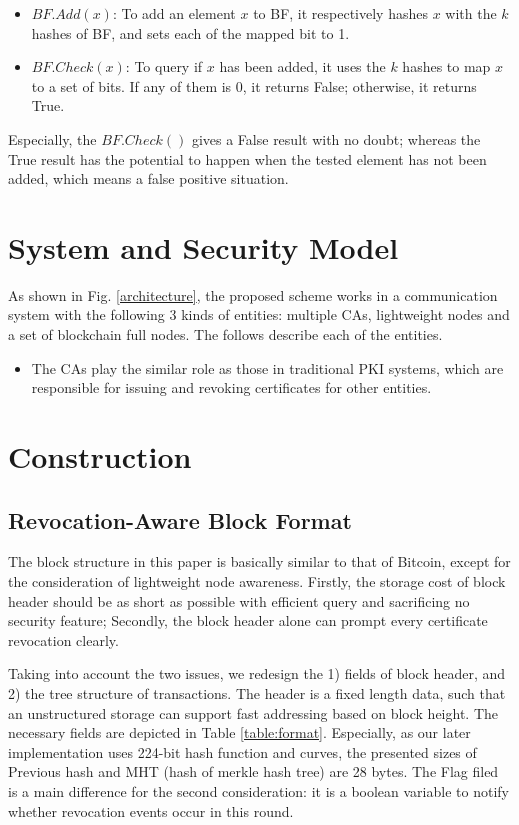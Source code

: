 \documentclass[conference]{IEEEtran}
\begin{document}
\begin{itemize}
    \item $BF.Add(x)$: To add an element $x$ to BF, it respectively hashes $x$ with the $k$ hashes of BF, and sets each of the mapped bit to 1.
	\item $BF.Check(x)$: To query if $x$ has been added, it uses the $k$ hashes to map $x$ to a set of bits. If any of them is 0, it returns False; otherwise, it returns True. 
\end{itemize}

Especially, the $BF.Check()$ gives a False result with no doubt; whereas the True result has the potential to happen when the tested element has not been added, which means a false positive situation.


\section{System and Security Model}
As shown in Fig. \ref{architecture}, the proposed scheme works in a communication system with the following 3 kinds of entities: multiple CAs, lightweight nodes and a set of blockchain full nodes. The follows describe each of the entities. 

\begin{itemize}
	\item The CAs play the similar role as those in traditional PKI systems, which are responsible for issuing and revoking certificates for other entities. 
\end{itemize}


\section{Construction}
\subsection{Revocation-Aware Block Format}
The block structure in this paper is basically similar to that of Bitcoin, except for the consideration of lightweight node awareness. Firstly, the storage cost of block header should be as short as possible with efficient query and sacrificing no security feature; Secondly, the block header alone can prompt every certificate revocation clearly. 

Taking into account the two issues, we redesign the 1) fields of block header, and 2) the tree structure of transactions. The header is a fixed length data, such that an unstructured storage can support fast addressing based on block height. The necessary fields are depicted in Table \ref{table:format}. Especially, as our later implementation uses 224-bit hash function and curves, the presented sizes of Previous hash and MHT (hash of merkle hash tree) are 28 bytes. The Flag filed is a main difference for the second consideration: it is a boolean variable to notify whether revocation events occur in this round.
\end{document}
